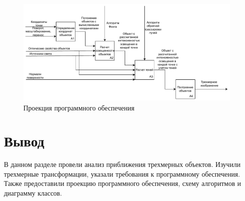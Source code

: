 \begin{figure}[h]
	\begin{center}
		\includegraphics[width=\linewidth]{photos/idef0_2.pdf}
	\end{center}
	\caption{Проекция программного обеспечения}
	\label{fig:idef0_2}
\end{figure}

\section*{Вывод}
В данном разделе провели анализ приближения трехмерных объектов. 
Изучили трехмерные трансформации, указали требования к программному обеспечения. 
Также предоставили проекцию программного обеспечения, схему алгоритмов и  диаграмму классов.